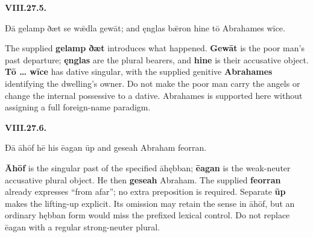 \par\begin{minipage}{\linewidth}\raggedright
\textbf{VIII.27.5.}

Ðā gelamp ðæt se wǣdla gewāt; and ęnglas bǣron hine tō Abrahames wīce.

The supplied \textbf{gelamp ðæt} introduces what happened. \textbf{Gewāt} is the poor man's past departure; \textbf{ęnglas} are the plural bearers, and \textbf{hine} is their accusative object. \textbf{Tō … wīce} has dative singular, with the supplied genitive \textbf{Abrahames} identifying the dwelling's owner. Do not make the poor man carry the angels or change the internal possessive to a dative. Abrahames is supported here without assigning a full foreign-name paradigm.

\end{minipage}\par\addvspace{4pt}

\par\begin{minipage}{\linewidth}\raggedright
\textbf{VIII.27.6.}

Ðā āhōf hē his ēagan ūp and geseah Abraham feorran.

\textbf{Āhōf} is the singular past of the specified āhębban; \textbf{ēagan} is the weak-neuter accusative plural object. He then \textbf{geseah} Abraham. The supplied \textbf{feorran} already expresses “from afar”; no extra preposition is required. Separate \textbf{ūp} makes the lifting-up explicit. Its omission may retain the sense in āhōf, but an ordinary hębban form would miss the prefixed lexical control. Do not replace ēagan with a regular strong-neuter plural.

\end{minipage}\par\addvspace{4pt}


